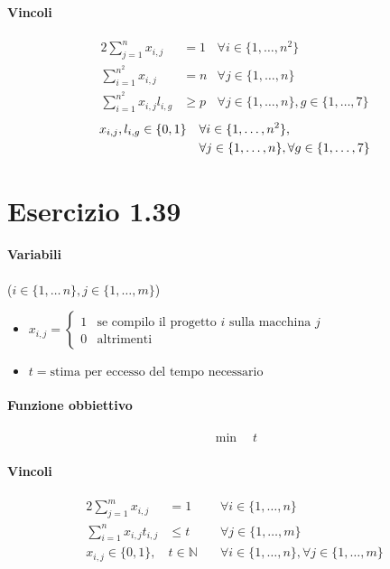 \documentclass{article}
\begin{document}
\paragraph{Vincoli}
\begin{alignat}{2}
  \sum_{j=1}^n x_{i,j} &= 1 &\forall i \in \{1,\ldots,n^2\} \\
  \sum_{i=1}^{n^2} x_{i,j} &= n &\forall j \in \{1,\ldots,n\} \\
  \sum_{i=1}^{n^2} x_{i,j} l_{i,g} &\geq p &\forall j \in \{1,\ldots,n\}, g \in \{1,\ldots,7\}
\end{alignat}
\begin{align}
  \setcounter{equation}{3}
  x_{i,j}, l_{i,g} \in \{0,1\} \quad &\forall i \in \{1,\ldots,n^2\}, \\
  \nonumber  &\forall j \in \{1,\ldots,n\}, \forall g \in \{1,\ldots,7\}
\end{align}

\pagebreak
\section{Esercizio 1.39}

\paragraph{Variabili} ($i \in \{1,\ldots\,n\}, j \in \{1,\ldots,m\}$)
\begin{itemize}
  \item $x_{i,j} = \begin{cases}
    1 &\text{se compilo il progetto }i\text{ sulla macchina }j \\
    0 &\text{altrimenti}
  \end{cases}$
  \item $t = \text{stima per eccesso del tempo necessario}$
\end{itemize}

\paragraph{Funzione obbiettivo}
\begin{align*}
  \min \quad t
\end{align*}

\paragraph{Vincoli}
\begin{alignat}{2}
  \sum_{j=1}^m x_{i,j} &= 1 &\forall i \in \{1,\ldots,n\} \\
  \sum_{i=1}^n x_{i,j} t_{i,j} &\leq t &\forall j \in \{1,\ldots,m\} \\
  x_{i,j} \in \{0,1\}, &t \in \mathbb{N} \quad &\forall i \in \{1,\ldots,n\}, \forall j \in \{1,\ldots,m\}
\end{alignat}
\end{document}
